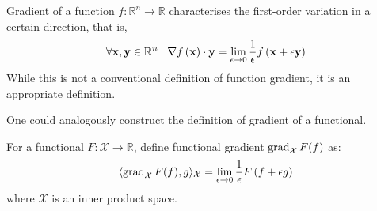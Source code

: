 \documentclass[../dissertation.tex]{subfiles}
\begin{document}
Gradient of a function $f:\mathbb{R}^n \rightarrow \mathbb{R}$ characterises the first-order variation in a certain direction,
that is,
\begin{equation}
    \forall \mathbf{x}, \mathbf{y} \in \mathbb{R}^n \; \; \;
    \nabla f \left( \mathbf{x} \right) \cdot \mathbf{y} = \lim_{\epsilon \rightarrow 0} \frac{1}{\epsilon} f\left( \mathbf{x} + \epsilon \mathbf{y} \right) 
\end{equation}
While this is not a conventional definition of function gradient, it is an appropriate definition.

One could analogously construct the definition of gradient of a functional.
\begin{definition}
    For a functional $F:\mathcal{X} \rightarrow \mathbb{R}$, define functional gradient $\operatorname{grad}_{\mathcal{X}} F (f)$ as:
    \begin{equation}
        \langle \operatorname{grad}_{\mathcal{X}} F (f), g \rangle_{\mathcal{X}} = \lim_{\epsilon \rightarrow 0} \frac{1}{\epsilon} F\left( f + \epsilon g \right)
    \end{equation}
    where $\mathcal{X}$ is an inner product space.
\end{definition}
\end{document}

